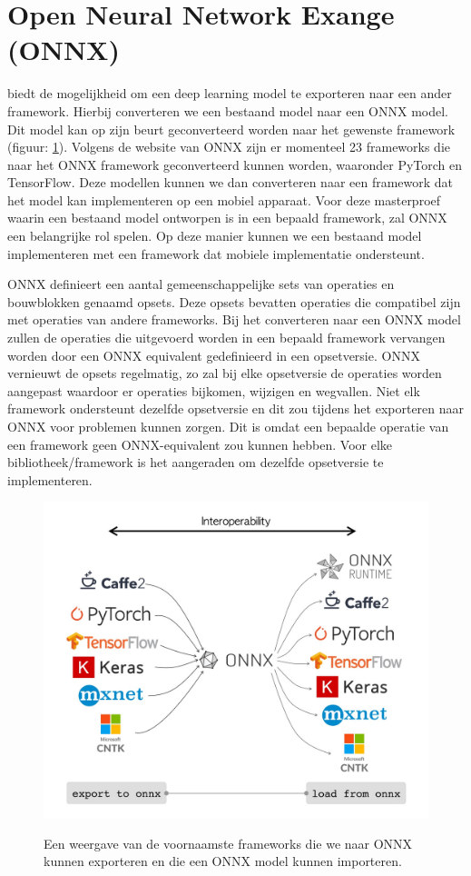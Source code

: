 \section{Open Neural Network Exange (ONNX)}
\cite{onnx_onnx_2017} biedt de mogelijkheid om een deep learning model te exporteren naar een ander framework.
Hierbij converteren we een bestaand model naar een ONNX model.
Dit model kan op zijn beurt geconverteerd worden naar het gewenste framework (figuur: \ref{fig:onnx}).
Volgens de website van ONNX zijn er momenteel 23 frameworks die naar het ONNX framework geconverteerd kunnen worden, waaronder PyTorch en TensorFlow.
Deze modellen kunnen we dan converteren naar een framework dat het model kan implementeren op een mobiel apparaat.
Voor deze masterproef waarin een bestaand model ontworpen is in een bepaald framework, zal ONNX een belangrijke rol spelen.
Op deze manier kunnen we een bestaand model implementeren met een framework dat mobiele implementatie ondersteunt.

ONNX definieert een aantal gemeenschappelijke sets van operaties en bouwblokken genaamd opsets.
Deze opsets bevatten operaties die compatibel zijn met operaties van andere frameworks.
Bij het converteren naar een ONNX model zullen de operaties die uitgevoerd worden in een bepaald framework vervangen worden door een ONNX equivalent gedefinieerd in een opsetversie.
ONNX vernieuwt de opsets regelmatig, zo zal bij elke opsetversie de operaties worden aangepast waardoor er operaties bijkomen, wijzigen en wegvallen.
Niet elk framework ondersteunt dezelfde opsetversie en dit zou tijdens het exporteren naar ONNX voor problemen kunnen zorgen.
Dit is omdat een bepaalde operatie van een framework geen ONNX-equivalent zou kunnen hebben.
Voor elke bibliotheek/framework is het aangeraden om dezelfde opsetversie te implementeren.

\begin{figure}[!ht]
    \centering
 	\includegraphics[width=0.65\linewidth]{fig/onnx.jpeg}
 	\caption{Een weergave van de voornaamste frameworks die we naar ONNX kunnen exporteren en die een ONNX model kunnen importeren.}
 	\label{fig:onnx}
	\cite{Lopez_onnx_2020}
\end{figure}

